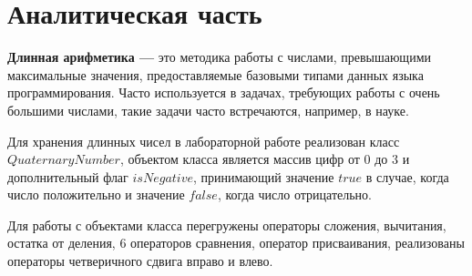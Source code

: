 \documentclass[12pt, a4paper]{article}
\begin{document}
\section{Аналитическая часть}
\textbf{Длинная арифметика ---} это методика работы 
с числами, превышающими максимальные значения, 
предоставляемые базовыми типами данных языка 
программирования. Часто используется в задачах, 
требующих работы с очень большими числами, такие
задачи часто встречаются, например, в науке. 

Для хранения длинных чисел в лабораторной работе 
реализован класс $QuaternaryNumber$, объектом класса 
является массив цифр от 0 до 3 и дополнительный флаг
$isNegative$, принимающий значение $true$ в случае, 
когда число положительно и значение $false$, когда
число отрицательно.

Для работы с объектами класса перегружены операторы
сложения, вычитания, остатка от деления, 6 
операторов сравнения, оператор присваивания, реализованы операторы 
четверичного сдвига вправо и влево.
\newpage
\end{document}
